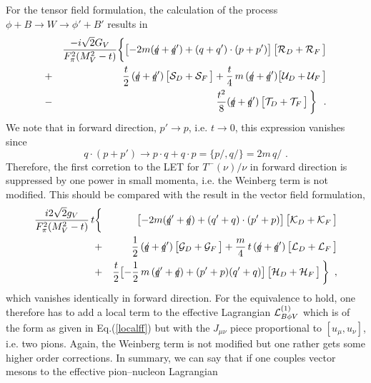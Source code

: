 For the tensor field formulation, the calculation of the process
$\phi + B \to W \to \phi' +B'$ results in
\begin{eqnarray}
& &\frac{-i \sqrt{2} G_V}{F^2_\pi  (M_V^2-t)} \biggl\{ \bigl[ - 2 m
( q\!\!\!/ + q\!\!\!/ ') + ( q+q') \cdot (p+p') \bigr]  \, \bigl[ {\cal R}_D +
{\cal R}_F \, \bigr] \nonumber \\
& + & \frac{t}{2}  \, (q\!\!\!/ + q\!\!\!/ ')\, \bigl[ {\cal S}_D +
{\cal S}_F \, \bigr] + \frac{t}{4} \, m \, ( q\!\!\!/ + q\!\!\!/ ')
\bigl[ {\cal U}_D + {\cal U}_F \, \bigr] \nonumber \\
& - &  \frac{t^2}{8}  (q\!\!\!/ + q\!\!\!/ ' ) \,
\bigl[ {\cal T}_D + {\cal T}_F \, \bigr] \, \biggr\} \, \, \, \, .
\label{pint}
\end{eqnarray}
We note that in forward direction, $p' \to p$, i.e. $t \to 0$, this
expression vanishes since
\begin{equation}
q \cdot (p+p') \to p \cdot q + q \cdot p = \{ p\!\!\!/ , q\!\!\!/ \}
= 2 m \, q\!\!\!/ \, \, .
\end{equation}
Therefore, the first corretion to the LET for $T^- (\nu) / \nu$ in
forward direction is suppressed by one power in small momenta, i.e.
the Weinberg term is not modified. This should be compared with the
result in the vector field formulation,
\begin{eqnarray}
\frac{i 2 \sqrt{2} g_V}{F^2_\pi  (M_V^2-t)} \, t
 & \biggl\{ & \bigl[ - 2 m
(q\!\!\!/ ' + q\!\!\!/ ) +  (q'+q) \cdot (p' +p) \bigr] \,
\bigl[ {\cal K}_D + {\cal K}_F \, \bigr] \nonumber \\
& + & \frac{1}{2} \, ( q\!\!\!/ + q\!\!\!/ ') \, \bigl[ {\cal G}_D +
{\cal G}_F \, \bigr]
 +  \frac{m}{4} \, t \, ( q\!\!\!/ + q\!\!\!/ ') \, \bigl[ {\cal L}_D +
{\cal L}_F \, \bigr] \nonumber \\
& + & \frac{t}{2} \bigl[ -\frac{1}{2} \, m \, (q\!\!\!/ ' + q\!\!\!/ )
+ (p' + p) (q' + q) \bigr] \,\bigl[ {\cal H}_D + {\cal H}_F \, \bigr]
\, \biggr\}  \, \, \, ,
\label{pinv}
\end{eqnarray}
which vanishes identically in forward direction. For the equivalence
to hold, one therefore has to add a local term to the
effective Lagrangian ${\cal L}^{(1)}_{B\phi V}$ which is of the form
as given in Eq.(\ref{localff}) but with the $J_{\mu \nu}$ piece
proportional to $[u_\mu , u_\nu]$, i.e. two pions.
Again, the Weinberg term is not modified but one rather gets some
higher order corrections. In summary, we can say that if one couples
vector mesons to the effective pion--nucleon Lagrangian
